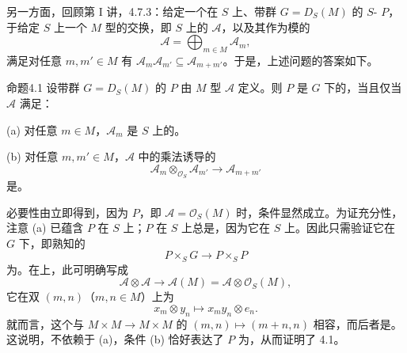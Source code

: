 另一方面，回顾第 I 讲，4.7.3：给定一个在 $S$ 上、带群 $G=D_S(M)$ 的 $S$- $P$，于给定 $S$ 上一个 $M$ 型的交换，即 $S$ 上的 $\mathcal A$，以及其作为模的
\[
\mathcal A=\bigoplus_{m\in M}\mathcal A_m,
\]
满足对任意 $m,m'\in M$ 有 $\mathcal A_m\mathcal A_{m'}\subseteq\mathcal A_{m+m'}$。于是，上述问题的答案如下。
\begin{SGAresult}{命题}{4.1}
设带群 $G=D_S(M)$ 的 $P$ 由 $M$ 型 $\mathcal A$ 定义。则 $P$ 是 $G$ 下的，当且仅当 $\mathcal A$ 满足：

(a) 对任意 $m\in M$，$\mathcal A_m$ 是 $S$ 上的。

(b) 对任意 $m,m'\in M$，$\mathcal A$ 中的乘法诱导的
\[
\mathcal A_m\otimes_{\mathcal O_S}\mathcal A_{m'}\longrightarrow\mathcal A_{m+m'}
\]
是。
\end{SGAresult}
必要性由立即得到，因为 $P$，即 $\mathcal A=\mathcal O_S(M)$ 时，条件显然成立。为证充分性，注意 (a) 已蕴含 $P$ 在 $S$ 上；$P$ 在 $S$ 上总是，因为它在 $S$ 上。因此只需验证它在 $G$ 下，即熟知的
\[
P\times_SG\longrightarrow P\times_SP
\]
为。在上，此可明确写成
\[
\mathcal A\otimes\mathcal A\longrightarrow\mathcal A(M)=\mathcal A\otimes\mathcal O_S(M),
\]
它在双 $(m,n)$（$m,n\in M$）上为
\[
x_m\otimes y_n\longmapsto x_my_n\otimes e_n.
\]
就而言，这个与 $M\times M\to M\times M$ 的 $(m,n)\mapsto(m+n,n)$ 相容，而后者是。这说明，不依赖于 (a)，条件 (b) 恰好表达了 $P$ 为，从而证明了 4.1。

